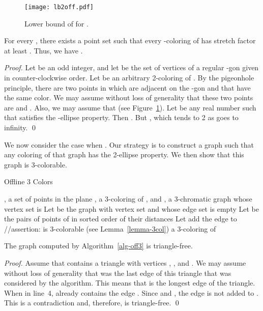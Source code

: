 \documentclass[pdftex,leqno,fleqn,12pts]{llncs}
\begin{document}
\begin{figure}
\centering\texttt{[image: lb2off.pdf]}\caption{Lower bound of
 for .}\label{fig-lb2off}
\end{figure}

\begin{lemma}\label{prop-lb2off} 
For every , there exists a point set  such that every
-coloring of  has stretch factor at least . 
Thus, we have .
\end{lemma}
\begin{proof} 
Let  be an odd integer, and let  be the set of 
vertices of a regular -gon given in counter-clockwise order. 
Let  be an arbitrary 2-coloring of . By the pigeonhole principle, 
there are two points in  which are adjacent on the -gon and 
that have the same color. We may assume without loss of generality 
that these two points are  and . Also, we may assume that 
 (see Figure~\ref{fig-lb2off}).
Let  be any real number such that  satisfies the -ellipse 
property. Then . But , 
which tends to 2 as  goes to infinity.
\qed 
\end{proof}

We now consider the case when . Our strategy is to construct a 
graph such that any coloring of that graph has the 2-ellipse property. 
We then show that this graph is 3-colorable.

\begin{algorithm}
\caption{Offline 3 Colors}\label{alg-off3}
\begin{algorithmic}[1]
\REQUIRE , a set of  points in the plane
\ENSURE , a 3-coloring of , and , a 3-chromatic graph whose 
vertex set is 
\STATE Let  be the graph with vertex set  and whose edge set 
is empty
\STATE Let  be the pairs of points of
 in sorted order of their distances 
\STATE Let 
\label{addrule}
\STATE add the edge  to 
\ENDIF
\ENDFOR
\STATE //assertion:  is 3-colorable (see Lemma~\ref{lemma-3col})
\label{line-assert-3col}
\STATE  a 3-coloring of 
\end{algorithmic}
\end{algorithm}





\begin{lemma}   \label{lemma-triangle-free} 
The graph  computed by Algorithm~\ref{alg-off3} is triangle-free.
\end{lemma}
\begin{proof}
Assume that  contains a triangle with vertices , , and . 
We may assume without loss of generality that  was the last 
edge of this triangle that was considered by the algorithm. This means that  is the longest edge of the triangle. 
When  in line~4,  already contains the
edge . Since  and
,
the edge  is not added to . This is a contradiction and, 
therefore,  is triangle-free.
\qed 
\end{proof}
\end{document}
